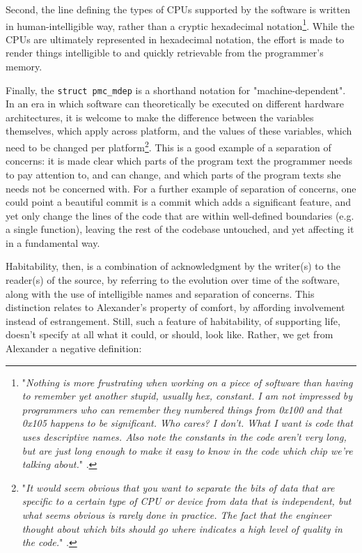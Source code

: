 Second, the line defining the types of CPUs supported by the software is written in human-intelligible way, rather than a cryptic hexadecimal notation\footnote{"\emph{Nothing is more frustrating when working on a piece of software than having to remember yet another stupid, usually hex, constant. I am not impressed by programmers who can remember they numbered things from 0x100 and that 0x105 happens to be significant. Who cares? I don’t. What I want is code that uses descriptive names. Also note the constants in the code aren’t very long, but are just long enough to make it easy to know in the code which chip we’re talking about.}" \citep{vicious_beautiful_2008}.}. While the CPUs are ultimately represented in hexadecimal notation, the effort is made to render things intelligible to and quickly retrievable from the programmer's memory.

Finally, the \lstinline{struct pmc_mdep} is a shorthand notation for "machine-dependent". In an era in which software can theoretically be executed on different hardware architectures, it is welcome to make the difference between the variables themselves, which apply across platform, and the values of these variables, which need to be changed per platform\footnote{"\emph{It would seem obvious that you want to separate the bits of data that are specific to a certain type of CPU or device from data that is independent, but what seems obvious is rarely done in practice. The fact that the engineer thought about which bits should go where indicates a high level of quality in the code.}" \citep{vicious_beautiful_2008}.}. This is a good example of a separation of concerns: it is made clear which parts of the program text the programmer needs to pay attention to, and can change, and which parts of the program texts she needs not be concerned with. For a further example of separation of concerns, one could point a beautiful commit is a commit which adds a significant feature, and yet only change the lines of the code that are within well-defined boundaries (e.g. a single function), leaving the rest of the codebase untouched, and yet affecting it in a fundamental way.

Habitability, then, is a combination of acknowledgment by the writer(s) to the reader(s) of the source, by referring to the evolution over time of the software, along with the use of intelligible names and separation of concerns. This distinction relates to Alexander's property of comfort, by affording involvement instead of estrangement. Still, such a feature of habitability, of supporting life, doesn't specify at all what it could, or should, look like. Rather, we get from Alexander a negative definition:

